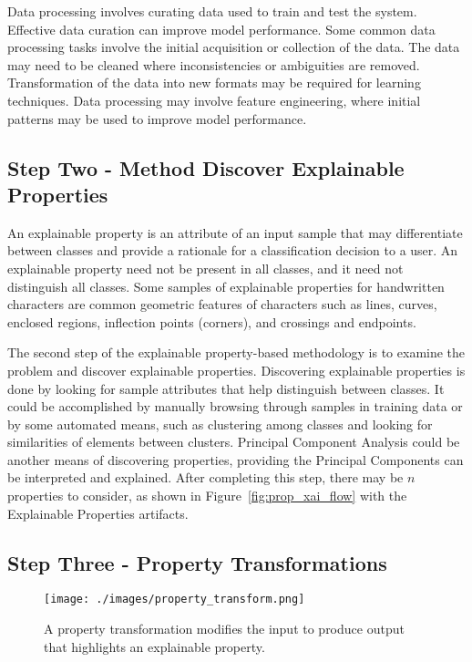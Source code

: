 Data processing involves curating data used to train and test the system.
Effective data curation can improve model performance. Some common data
processing tasks involve the initial acquisition or collection of the data. The
data may need to be cleaned where inconsistencies or ambiguities are removed.
Transformation of the data into new formats may be required for learning
techniques. Data processing may involve feature engineering, where initial
patterns may be used to improve model performance.

\subsection{Step Two - Method Discover Explainable Properties} %

An explainable property is an attribute of an input sample that may
differentiate between classes and provide a rationale for a classification
decision to a user. An explainable property need not be present in all classes,
and it need not distinguish all classes. Some samples of explainable properties
for handwritten characters are common geometric features of characters such as
lines, curves, enclosed regions, inflection points (corners), and crossings and
endpoints.

The second step of the explainable property-based methodology is to examine the
problem and discover explainable properties. Discovering explainable properties
is done by looking for sample attributes that help distinguish between classes.
It could be accomplished by manually browsing through samples in training data
or by some automated means, such as clustering among classes and looking for
similarities of elements between clusters. Principal Component Analysis could be
another means of discovering properties, providing the Principal Components can
be interpreted and explained. After completing this step, there may be $n$
properties to consider, as shown in Figure~\ref{fig:prop_xai_flow} with the
Explainable Properties artifacts.


\subsection{Step Three - Property Transformations} %


\begin{figure}[h]
    \texttt{[image: ./images/property\_transform.png]}
    \caption{A property transformation modifies the input to produce output that highlights an explainable property.}
    \label{fig:property_transform_ex}
\end{figure}

